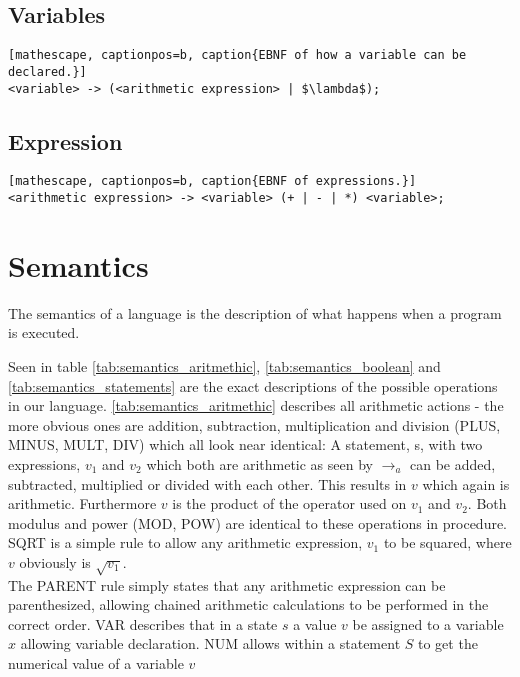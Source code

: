 \subsection{Variables}
\begin{lstlisting}[mathescape, captionpos=b, caption{EBNF of how a variable can be declared.}]
<variable> -> (<arithmetic expression> | $\lambda$);
\end{lstlisting}

\subsection{Expression}
\begin{lstlisting}[mathescape, captionpos=b, caption{EBNF of expressions.}]
<arithmetic expression> -> <variable> (+ | - | *) <variable>;
\end{lstlisting}

\section{Semantics}
The semantics of a language is the description of what happens when a program is executed.

Seen in table \ref{tab:semantics_aritmethic}, \ref{tab:semantics_boolean} and \ref{tab:semantics_statements} are the exact descriptions of the possible operations in our language. \ref{tab:semantics_aritmethic} describes all arithmetic actions - the more obvious ones are addition, subtraction, multiplication and division (PLUS, MINUS, MULT, DIV) which all look near identical: A statement, s, with two expressions, $v_{1}$ and $v_{2}$ which both are arithmetic as seen by $\rightarrow_{a}$ can be added, subtracted, multiplied or divided with each other. This results in $v$ which again is arithmetic. Furthermore $v$ is the product of the operator used on $v_{1}$ and $v_{2}$. Both modulus and power (MOD, POW) are identical to these operations in procedure. \\
SQRT is a simple rule to allow any arithmetic expression, $v_{1}$ to be squared, where $v$ obviously is $\sqrt{v_{1}}$. \\
The PARENT rule simply states that any arithmetic expression can be parenthesized, allowing chained arithmetic calculations to be performed in the correct order. VAR describes that in a state $s$ a value $v$ be assigned to a variable $x$ allowing variable declaration. NUM allows within a statement $S$ to get the numerical value of a variable $v$ \\

